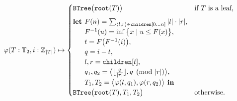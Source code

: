 \documentclass[portrait,a0b,final,a4resizeable]{a0poster}
\def\jointspacing{\vspace{0.3in}}
\begin{document}
\begin{poster}
\begin{multicols}{2}
\begin{equation*}
\varphi(T: \mathbb{T}_2, i: \mathbb{Z}_{|T|}) \mapsto \begin{cases}
\texttt{BTree}\big(\texttt{root}(T)\big) & \text{if $T$ is a leaf,} \vspace{5pt}\\
\textbf{let } F(n) = \sum_{\langle l, r\rangle \in \texttt{children}[0 \ldots n]}|l|\cdot|r|,\\
\phantom{\textbf{let }} F^{-1}(u) = \inf \big\{x \mid u \leq F(x)\big\},\\
\phantom{\textbf{let }} t = F\big(F^{-1}(i)\big),\\
\phantom{\textbf{let }} q = i - t,\\
\phantom{\textbf{let }} l, r = \texttt{children}[t],\\
\phantom{\textbf{let }} q_1, q_2 = \big\langle\lfloor\frac{q}{|r|}\rfloor, q \pmod{|r|}\big\rangle,\\
\phantom{\textbf{let }} T_1, T_2 = \big\langle\varphi(l, q_1), \varphi(r, q_2)\big\rangle \textbf{ in } \\
\texttt{BTree}\big(\texttt{root}(T), T_1, T_2\big) & \text{otherwise.} \\
\end{cases}
\end{equation*}

      \hspace*{2cm}\begin{minipage}[c]{0.90\columnwidth}
\vspace{1cm}
      \end{minipage}

      \jointspacing

    \end{multicols}

    \vspace{-2.2cm}
    \bottombox{

}
\end{poster}
\end{document}
